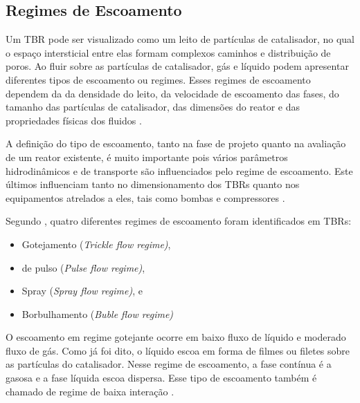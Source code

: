 \subsection {Regimes de Escoamento}
\label{sec:escoamento}

Um TBR pode ser visualizado como um leito de partículas de catalisador, no qual
o espaço intersticial entre elas formam complexos caminhos e distribuição de
poros. Ao fluir sobre as partículas de catalisador, gás e líquido podem
apresentar diferentes tipos de escoamento ou regimes. Esses regimes de
escoamento dependem da da densidade do leito, da velocidade de escoamento das
fases, do tamanho das partículas de catalisador, das dimensões do reator e das
propriedades físicas dos fluidos \cite{Ranade2011}.

A definição do tipo de escoamento, tanto na fase de projeto quanto na avaliação
de um reator existente, é muito importante pois vários parâmetros
hidrodinâmicos e de transporte são influenciados pelo regime de escoamento. Este
últimos influenciam tanto no dimensionamento dos TBRs quanto nos
equipamentos atrelados a eles, tais como bombas e compressores
\cite{Ranade2011}.

Segundo , quatro
diferentes regimes de escoamento foram identificados em TBRs:

\begin{itemize}
	\item Gotejamento (\emph{Trickle flow regime)},
	\item de pulso (\emph{Pulse flow regime)},
	\item Spray (\emph{Spray flow regime)}, e
	\item Borbulhamento (\emph{Buble flow regime)}
\end{itemize}



O escoamento em regime gotejante ocorre em baixo fluxo de líquido e moderado
fluxo de gás. Como já foi dito, o líquido escoa em forma de filmes ou filetes
sobre as partículas do catalisador. Nesse regime de escoamento, a fase contínua
é a gasosa e a fase líquida escoa dispersa. Esse tipo de escoamento também é
chamado de regime de baixa interação \cite{Saroha1996}.

